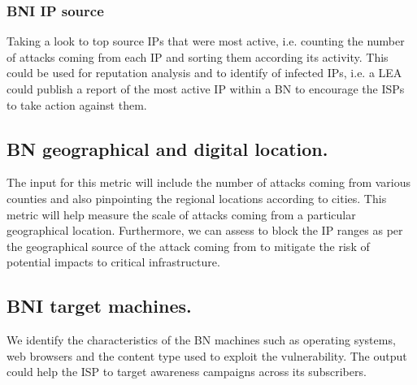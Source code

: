     \subsubsection{BNI IP source}
    Taking a look to top source IPs that were most active, i.e. counting the number of attacks coming from each IP and sorting them according its activity. This could be used for reputation analysis and to identify of infected IPs, i.e. a LEA could publish a report of the most active IP within a BN to encourage the ISPs to take action against them.


\subsection{BN geographical and digital location.} The input for this metric will include the number of attacks coming from various counties and also pinpointing the regional locations according to cities. This metric will help measure the scale of attacks coming from a particular geographical location. Furthermore, we can assess to block the IP ranges as per the geographical source of the attack coming from to mitigate the risk of potential impacts to critical infrastructure.


\subsection{BNI target machines.}
    We identify the characteristics of the BN machines such as operating systems, web browsers and the content type used to exploit the vulnerability. The output could help the ISP to target awareness campaigns across its subscribers.
\indent

